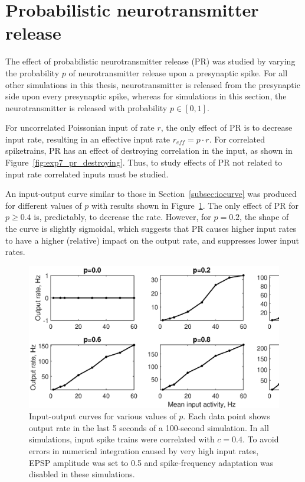 \documentclass[a4paper,12pt]{report}
\theoremstyle{definition}
\begin{document}
\section{Probabilistic neurotransmitter release} %

The effect of probabilistic neurotransmitter release (PR) was studied by varying the probability $p$ of neurotransmitter release upon a presynaptic spike. For all other simulations in this thesis, neurotransmitter is released from the presynaptic side upon every presynaptic spike, whereas for simulations in this section, the neurotransmitter is released with probability $p \in [0,1]$.

For uncorrelated Poissonian input of rate $r$, the only effect of PR is to decrease input rate, resulting in an effective input rate $r_{eff} = p \cdot r$. For correlated spiketrains, PR has an effect of destroying correlation in the input, as shown in Figure~\ref{fig:exp7_pr_destroying}. Thus, to study effects of PR not related to input rate correlated inputs must be studied.



An input-output curve similar to those in Section~\ref{subsec:iocurve} was produced for different values of $p$ with results shown in Figure~\ref{fig:exp8gridoutputs}. The only effect of PR for $p \geq 0.4$ is, predictably, to decrease the rate. However, for $p=0.2$, the shape of the curve is slightly sigmoidal, which suggests that PR causes higher input rates to have a higher (relative) impact on the output rate, and suppresses lower input rates.

\begin{figure}[!htb]
    \includegraphics[width=\textwidth]{figures/exp8_gridoutputs_epsp05.eps}
    \caption{Input-output curves for various values of $p$. Each data point shows output rate in the last 5 seconds of a 100-second simulation. In all simulations, input spike trains were correlated with $c=0.4$. To avoid errors in numerical integration caused by very high input rates, EPSP amplitude was set to 0.5 and spike-frequency adaptation was disabled in these simulations.}
    \label{fig:exp8gridoutputs}
\end{figure}
\end{document}
